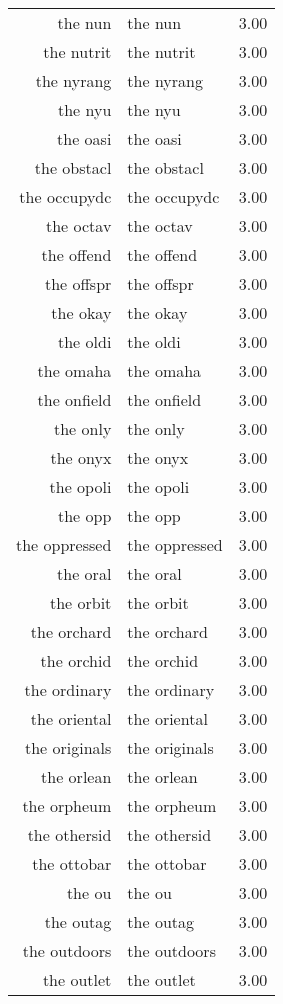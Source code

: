 \begin{table}[ht]
\begin{tabular}{rlr}
  the nun & the nun & 3.00 \\ 
  the nutrit & the nutrit & 3.00 \\ 
  the nyrang & the nyrang & 3.00 \\ 
  the nyu & the nyu & 3.00 \\ 
  the oasi & the oasi & 3.00 \\ 
  the obstacl & the obstacl & 3.00 \\ 
  the occupydc & the occupydc & 3.00 \\ 
  the octav & the octav & 3.00 \\ 
  the offend & the offend & 3.00 \\ 
  the offspr & the offspr & 3.00 \\ 
  the okay & the okay & 3.00 \\ 
  the oldi & the oldi & 3.00 \\ 
  the omaha & the omaha & 3.00 \\ 
  the onfield & the onfield & 3.00 \\ 
  the only & the only & 3.00 \\ 
  the onyx & the onyx & 3.00 \\ 
  the opoli & the opoli & 3.00 \\ 
  the opp & the opp & 3.00 \\ 
  the oppressed & the oppressed & 3.00 \\ 
  the oral & the oral & 3.00 \\ 
  the orbit & the orbit & 3.00 \\ 
  the orchard & the orchard & 3.00 \\ 
  the orchid & the orchid & 3.00 \\ 
  the ordinary & the ordinary & 3.00 \\ 
  the oriental & the oriental & 3.00 \\ 
  the originals & the originals & 3.00 \\ 
  the orlean & the orlean & 3.00 \\ 
  the orpheum & the orpheum & 3.00 \\ 
  the othersid & the othersid & 3.00 \\ 
  the ottobar & the ottobar & 3.00 \\ 
  the ou & the ou & 3.00 \\ 
  the outag & the outag & 3.00 \\ 
  the outdoors & the outdoors & 3.00 \\ 
  the outlet & the outlet & 3.00 \\ 

\end{tabular}
\end{table}
